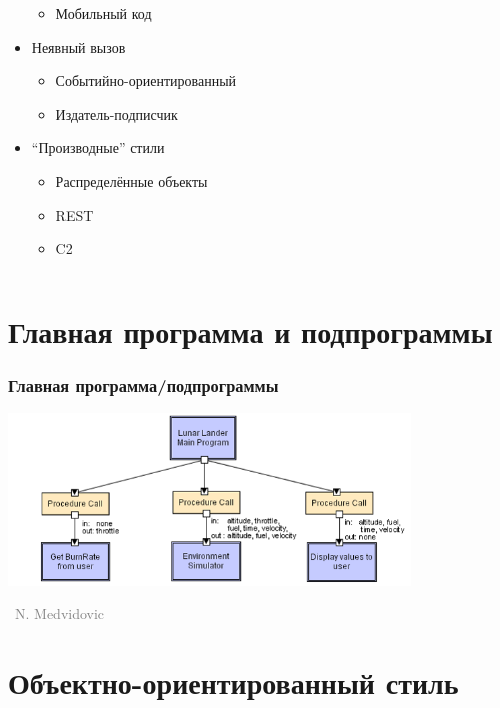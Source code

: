 \documentclass[xetex,mathserif,serif]{beamer}
\newcommand{\attribution}[1] {
    \vspace{-5mm}\begin{flushright}\begin{scriptsize}\textcolor{gray}{\textcopyright\, #1}\end{scriptsize}\end{flushright}
}
\begin{document}
\begin{frame}
\begin{columns}
\begin{column}{0.5\textwidth}
\begin{itemize}
\begin{itemize}
                        \item Мобильный код
                    \end{itemize}
                    \item Неявный вызов
                    \begin{itemize}
                        \item Событийно-ориентированный
                        \item Издатель-подписчик
                    \end{itemize}
                    \item ``Производные'' стили
                    \begin{itemize}
                        \item Распределённые объекты
                        \item REST
                        \item C2
                    \end{itemize}
                \end{itemize}
            \end{column}
        \end{columns}
    \end{frame}

    \section{Главная программа и подпрограммы}

    \begin{frame}
        \frametitle{Главная программа/подпрограммы}
        \begin{center}
            \includegraphics[width=0.8\textwidth]{mainProgramAndSubroutinesLL.png}
            \attribution{N. Medvidovic}
        \end{center}
    \end{frame}

    \section{Объектно-ориентированный стиль}
\end{document}
